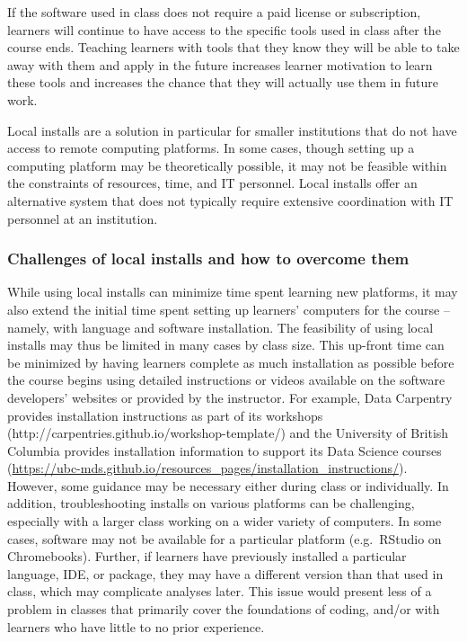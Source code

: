 If the software used in class does not require a paid license or subscription, learners will continue to have access to the specific tools used in class after the course ends. Teaching learners with tools that they know they will be able to take away with them and apply in the future increases learner motivation to learn these tools and increases the chance that they will actually use them in future work.

Local installs are a solution in particular for smaller institutions that do not have access to remote computing platforms. In some cases, though setting up a computing platform may be theoretically possible, it may not be feasible within the constraints of resources, time, and IT personnel. Local installs offer an alternative system that does not typically require extensive coordination with IT personnel at an institution.

\subsubsection{Challenges of local installs and how to overcome them} 

While using local installs can minimize time spent learning new platforms, it may also extend the initial time spent setting up learners' computers for the course -- namely, with language and software installation. The feasibility of using local installs may thus be limited in many cases by class size. This up-front time can be minimized by having learners complete as much installation as possible before the course begins
using detailed instructions or videos available on the software developers' websites or provided by the instructor.
For example, Data Carpentry provides installation instructions as part of its workshops (http://carpentries.github.io/workshop-template/) and the University of British Columbia
provides installation information to support its Data Science courses (\url{https://ubc-mds.github.io/resources_pages/installation_instructions/}).
However, some guidance may be necessary either during class or individually.
In addition, troubleshooting installs on various platforms can be challenging, especially with a larger class working on a wider variety of computers. 
In some cases, software may not be available for a particular platform (e.g.\ RStudio on Chromebooks).
Further, if learners have previously installed a particular language, IDE, or package, they may have a different version than that used in class, which may complicate analyses later. This issue would present less of a problem in classes that primarily cover the foundations of coding, and/or with learners who have little to no prior experience.

